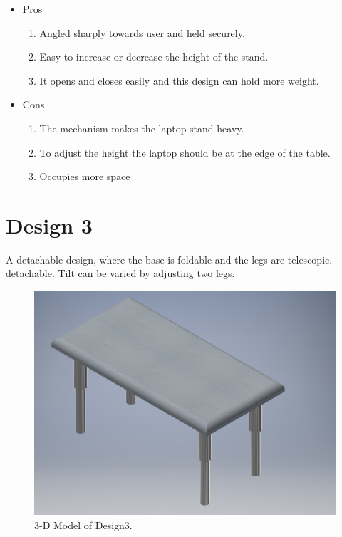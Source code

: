 \begin{itemize}
 \item Pros
 \begin{enumerate}
	\item Angled sharply towards user and held securely.
    \item Easy to increase or decrease the height of the stand.
    \item It opens and closes easily and this design can hold more weight.
 \end{enumerate}
 \newpage
 \item Cons
 \begin{enumerate}
	\item The mechanism makes the laptop stand heavy.
    \item To adjust the height the laptop should be at the edge of the table.
    \item Occupies more space
 \end{enumerate}
\end{itemize}

\section{Design 3}

A detachable design, where the base is foldable and the legs are telescopic, detachable. Tilt can be varied by adjusting two legs\cite{adj_kbtray}.

\begin{figure}
  \includegraphics[width=\linewidth]{design3_1}
  \caption{3-D Model of Design3.}
  \label{fig:Design1}
\end{figure}

